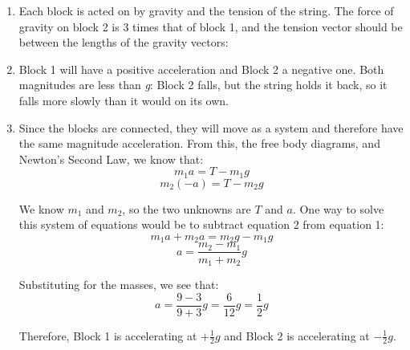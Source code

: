 \begin{Answer}[ref = block1]
\begin{enumerate}
    \item Each block is acted on by gravity and the tension of the string. The 
    force of gravity on block 2 is 3 times that of block 1, and the tension 
    vector should be between the lengths of the gravity vectors:
    \begin{center}
    \end{center}

    \item Block 1 will have a positive acceleration and Block 2 a negative one. 
    Both magnitudes are less than \textit{g}: Block 2 falls, but the string 
    holds it back, so it falls more slowly than it would on its own.

    \item Since the blocks are connected, they will move as a system and 
    therefore have the same magnitude acceleration. From this, the free body 
    diagrams, and Newton's Second Law, we know that:
    $$m_1 a  = T - m_1 g$$
    $$m_2 \left( - a \right) = T - m_2 g$$

    We know $m_1$ and $m_2$, so the two unknowns are $T$ and $a$. One way to 
    solve this system of equations would be to subtract equation 2 from equation 1:
    $$m_1 a + m_2 a = m_2 g - m_1 g$$
    $$a = \frac{m_2 - m_1}{m_1 + m_2} g$$

    Substituting for the masses, we see that:
    $$a = \frac{9 - 3}{9 + 3}g = \frac{6}{12}g = \frac{1}{2}g$$

    Therefore, Block 1 is accelerating at $+\frac{1}{2}g$ and Block 2 is 
    accelerating at $-\frac{1}{2}g$.
\end{enumerate}
\end{Answer}

